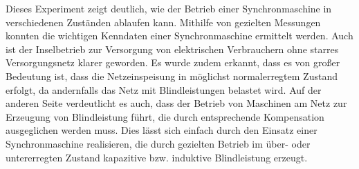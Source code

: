 \documentclass{report}
\begin{document}
Dieses Experiment zeigt deutlich, wie der Betrieb einer Synchronmaschine in verschiedenen Zuständen ablaufen kann. Mithilfe von gezielten Messungen konnten die wichtigen Kenndaten einer Synchronmaschine ermittelt werden. Auch ist der Inselbetrieb zur Versorgung von elektrischen Verbrauchern ohne starres Versorgungsnetz klarer geworden. Es wurde zudem erkannt, dass es von großer Bedeutung ist, dass die Netzeinspeisung in möglichst normalerregtem Zustand erfolgt, da andernfalls das Netz mit Blindleistungen belastet wird. Auf der anderen Seite verdeutlicht es auch, dass der Betrieb von Maschinen am Netz zur Erzeugung von Blindleistung führt, die durch entsprechende Kompensation ausgeglichen werden muss. Dies lässt sich einfach durch den Einsatz einer Synchronmaschine realisieren, die durch gezielten Betrieb im über- oder untererregten Zustand kapazitive bzw. induktive Blindleistung erzeugt.
\end{document}
